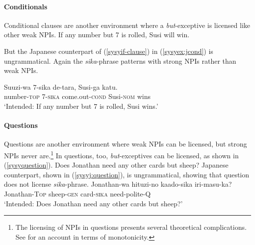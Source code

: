 \documentclass[output=paper,colorlinks,citecolor=brown,
]{langscibook}
\def\refp#1{(\ref{sy#1})}
\def\M#1{\textsc{#1}}
\begin{document}

   
\paragraph{Conditionals}
Conditional clauses are another environment where a \emph{but}-exceptive is licensed like other weak NPIs.
\ea \label{syif-clause}
If any number but 7 is rolled, Susi will win.\z

But the Japanese counterpart of \refp{syif-clause} in \refp{syex:jcond} is ungrammatical.  Again the \emph{sika}-phrase patterns with strong NPIs rather than weak NPIs.

\ea\label{syex:jcond}
   \gll *Suuzi-wa 7-sika de-tara, Susi-ga katu.\\
        number-\M{top} 7-\M{sika} come.out-\M{cond} Susi-\M{nom} wins\\
    \glt `Intended: If any number but 7 is rolled, Susi wins.'\z

\paragraph{Questions}
Questions are another environment where weak NPIs can be licensed, but strong NPIs never are.\footnote{The licensing of NPIs in questions presents several theoretical complications.  See \cite{nicolae15b} for an account in terms of monotonicity.} In questions, too, \emph{but}-exceptives can be licensed, as shown in \refp{syquestion}.
\ea \label{syquestion}
Does Jonathan need any other cards but sheep?\z
Japanese counterpart, shown in \refp{syj:question}, is ungrammatical, showing that question does not license \emph{sika}-phrase.
\ea \label{syj:question}
\gll *Jonathan-wa hituzi-no kaado-sika iri-masu-ka?\\
Jonathan-\M{Top} sheep-\M{gen} card-\M{sika} need-polite-\M{Q}\\
\glt `Intended: Does Jonathan need any other cards but sheep?'\z



\end{document}
